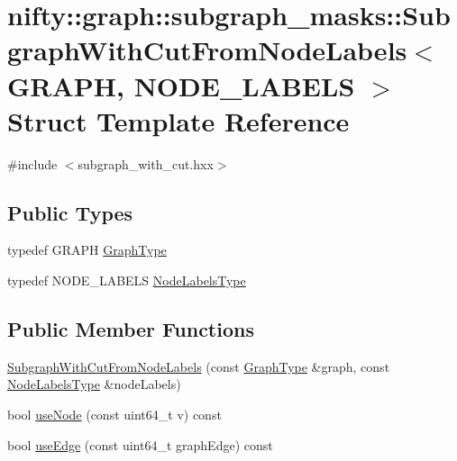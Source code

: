 \hypertarget{structnifty_1_1graph_1_1subgraph__masks_1_1SubgraphWithCutFromNodeLabels}{}\section{nifty\+:\+:graph\+:\+:subgraph\+\_\+masks\+:\+:Subgraph\+With\+Cut\+From\+Node\+Labels$<$ G\+R\+A\+PH, N\+O\+D\+E\+\_\+\+L\+A\+B\+E\+LS $>$ Struct Template Reference}
\label{structnifty_1_1graph_1_1subgraph__masks_1_1SubgraphWithCutFromNodeLabels}


{\ttfamily \#include $<$subgraph\+\_\+with\+\_\+cut.\+hxx$>$}

\subsection*{Public Types}
\begin{DoxyCompactItemize}
\item 
typedef G\+R\+A\+PH \hyperlink{structnifty_1_1graph_1_1subgraph__masks_1_1SubgraphWithCutFromNodeLabels_adc4d7dd452a818984b5afc989cc55a19}{Graph\+Type}
\item 
typedef N\+O\+D\+E\+\_\+\+L\+A\+B\+E\+LS \hyperlink{structnifty_1_1graph_1_1subgraph__masks_1_1SubgraphWithCutFromNodeLabels_aab0ef05152a0058c18c020c8220ad30f}{Node\+Labels\+Type}
\end{DoxyCompactItemize}
\subsection*{Public Member Functions}
\begin{DoxyCompactItemize}
\item 
\hyperlink{structnifty_1_1graph_1_1subgraph__masks_1_1SubgraphWithCutFromNodeLabels_abc60999bc3d3ba367572a5141062b031}{Subgraph\+With\+Cut\+From\+Node\+Labels} (const \hyperlink{structnifty_1_1graph_1_1subgraph__masks_1_1SubgraphWithCutFromNodeLabels_adc4d7dd452a818984b5afc989cc55a19}{Graph\+Type} \&graph, const \hyperlink{structnifty_1_1graph_1_1subgraph__masks_1_1SubgraphWithCutFromNodeLabels_aab0ef05152a0058c18c020c8220ad30f}{Node\+Labels\+Type} \&node\+Labels)
\item 
bool \hyperlink{structnifty_1_1graph_1_1subgraph__masks_1_1SubgraphWithCutFromNodeLabels_a3f3e3647488014f81f22a1cdc0f2b72c}{use\+Node} (const uint64\+\_\+t v) const
\item 
bool \hyperlink{structnifty_1_1graph_1_1subgraph__masks_1_1SubgraphWithCutFromNodeLabels_a4cdeee4cf4f944010629c4fd5d05970e}{use\+Edge} (const uint64\+\_\+t graph\+Edge) const
\end{DoxyCompactItemize}
